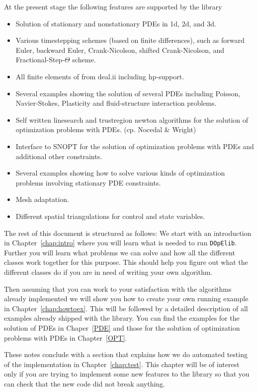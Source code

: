 At the present stage the following features are supported by the library
\begin{itemize}
\item Solution of stationary and nonstationary PDEs in 1d, 2d, and 3d.
\item Various timestepping schemes (based on finite differences), 
  such as forward Euler, backward Euler,
  Crank-Nicolson, shifted Crank-Nicolson, and Fractional-Step-$\Theta$ scheme.
\item All finite elements of from deal.ii including hp-support.
\item Several examples showing the solution of several PDEs including
   Poisson, Navier-Stokes, Plasticity and fluid-structure interaction problems. 
\item Self written linesearch and trustregion newton algorithms for the 
   solution of optimization problems with PDEs. (cp. Nocedal \& Wright)
\item Interface to SNOPT for the solution of optimization problems with PDEs and
  additional other constraints.
\item Several examples showing how to solve various kinds of optimization problems
  involving stationary PDE constraints.
\item Mesh adaptation.
\item Different spatial triangulations for control and state variables.
\end{itemize}
 
The rest of this document is structured as follows: We start with an introduction in
Chapter~\ref{chap:intro} where you will learn what is needed to run {\tt DOpElib}. 
Further you will learn what problems we can solve and how all the different classes 
work together for this purpose. This should help you figure out what the different classes
do if you are in need of writing your own algorithm.

Then assuming that you can work to your satisfaction with the algorithms already implemented
we will show you how to create your own running example in Chapter~\ref{chap:howtoex}.
This will be followed by a detailed description of all examples already shipped with 
the library. You can find the examples for the solution of PDEs in Chaper~\ref{PDE}
and those for the solution of optimization problems with PDEs in Chapter~\ref{OPT}.

These notes conclude with a section that explains how we do automated testing of the 
implementation in Chapter~\ref{chap:test}. This chapter will be of interest only if you 
are trying to implement some new features to the library so that you can check that 
the new code did not break anything.

